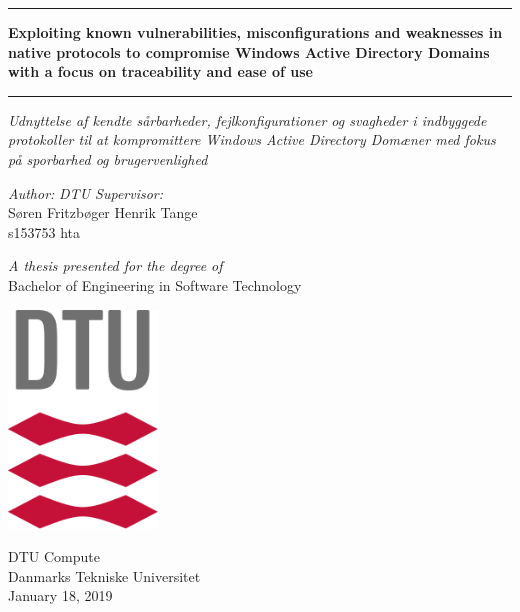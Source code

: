\documentclass{article}
\begin{document}
\begin{titlepage}
    \begin{center}
        \par\noindent\rule{\textwidth}{0.4pt}
        \Large
        \textbf{Exploiting known vulnerabilities, misconfigurations and weaknesses in native protocols to compromise Windows Active Directory Domains with a focus on traceability and ease of use}

        \par\noindent\rule{\textwidth}{0.4pt}

        \vspace{0.5cm}
        \large
        \emph{Udnyttelse af kendte sårbarheder, fejlkonfigurationer og svagheder i indbyggede protokoller til at kompromittere Windows Active Directory Domæner med fokus på sporbarhed og brugervenlighed}

        \vspace{1cm}
        \emph{Author:}      \hfill     \emph{DTU Supervisor:} \\
        Søren Fritzbøger    \hfill     Henrik Tange
        \\
        s153753             \hfill     hta

        \vfill

        \emph{A thesis presented for the degree of}\\
        Bachelor of Engineering in Software Technology

        \vspace{0.8cm}

        \includegraphics[width=0.3\textwidth]{figures/dtulogo}

        \Large
        DTU Compute\\
        Danmarks Tekniske Universitet\\
        \vfill
        January 18, 2019

    \end{center}
\end{titlepage}
\end{document}
